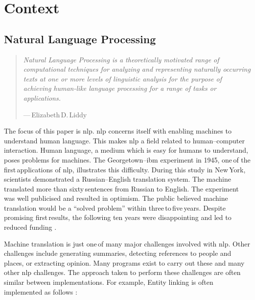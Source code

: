 \chapter{Context}\label{context}

\section{Natural Language Processing}\label{natural-language-processing}

\begin{quote}
  \textit{Natural Language Processing is a theoretically motivated range
    of computational techniques for analyzing and representing
    naturally occurring texts at one or more levels of linguistic
    analysis for the purpose of achieving human-like language processing
    for a range of tasks or applications.
  }

  \medskip
  ---\,Elizabeth\,D.\,Liddy \autocite*{natural-language-processing-liddy-2001}
\end{quote}

\noindent The focus of this paper is \gls{nlp}.
\gls{nlp} concerns itself with enabling machines to understand human
  language.
This makes \gls{nlp} a field related to human--computer interaction.
Human language, a medium which is easy for humans to understand, poses
  problems for machines.
The Georgetown--\gls{ibm} experiment in 1945, one\,of the first\,applications
  of \gls{nlp}, illustrates this difficulty.
During this study in New\,York, scientists demonstrated a
  Russian--English translation system.
The machine translated more than sixty\,sentences from Russian to English.
The experiment was well publicised and resulted in optimism.
The public believed machine translation would be a ``solved problem'' within
  three\,to\,five\,years.
Despite promising first\,results, the following ten years were disappointing
  and led to reduced funding \autocite{hutchins-john-georgetown-ibm-system}.

Machine translation is just one\,of many major challenges involved with
  \gls{nlp}.
Other challenges include generating summaries, detecting references to people
  and places, or extracting opinion.
Many programs exist to carry out these and many other \gls{nlp} challenges.
The approach taken to perform these challenges are often similar between
  implementations.
For example, Entity linking is often implemented as follows
  \autocite[according to][]{stanbol-enhancer-nlp}:

